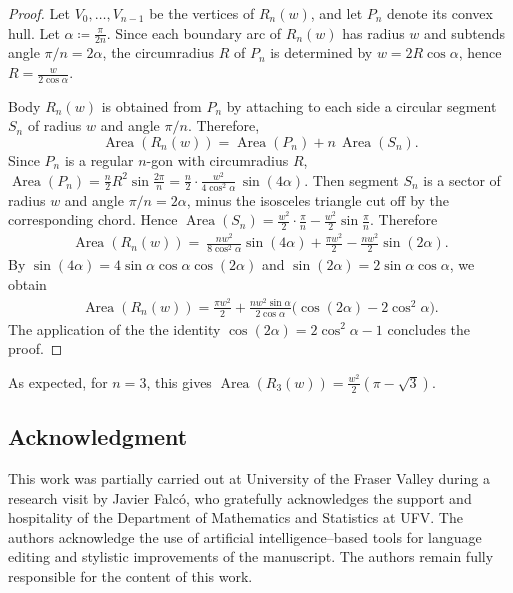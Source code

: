 \documentclass[11pt,letterpaper,reqno]{amsart}
\begin{document}
\begin{proof}
Let $V_0,\dots,V_{n-1}$ be the vertices of $R_n(w)$, and let $P_n$ denote its convex hull. Let
\(
\alpha\coloneqq \frac{\pi}{2n}.
\)
Since each boundary arc of $R_n(w)$ has radius $w$ and subtends angle $\pi/n=2\alpha$, the circumradius $R$ of $P_n$ is determined by
$w=2R\cos\alpha$,
hence
$R=\frac{w}{2\cos\alpha}$.


Body $R_n(w)$ is obtained from $P_n$ by attaching to each side a circular segment $S_n$ of radius $w$ and angle $\pi/n$. 
Therefore, 
\[
\operatorname{Area}(R_n(w))
=\operatorname{Area}(P_n)+n\,\operatorname{Area}(S_n).
\]
Since $P_n$ is a regular $n$-gon with circumradius $R$,
\(
\operatorname{Area}(P_n)=\frac{n}{2}R^2\sin\frac{2\pi}{n}
=\frac{n}{2}\cdot \frac{w^2}{4\cos^2\alpha}\,\sin(4\alpha).
\)
Then segment $S_n$ is a sector of radius $w$ and angle $\pi/n=2\alpha$, minus the isosceles triangle cut off by the corresponding chord. Hence
\(
\operatorname{Area}(S_n)
=\frac{w^2}{2}\cdot \frac{\pi}{n}-\frac{w^2}{2}\sin\frac{\pi}{n}.
\)
Therefore
\begin{align*}
\operatorname{Area}(R_n(w))
=\ \frac{n w^2}{8\cos^2\alpha}\sin(4\alpha)+\frac{\pi w^2}{2}-\frac{n w^2}{2}\sin(2\alpha).
\end{align*}
By $\sin(4\alpha)=4\sin\alpha\cos\alpha\cos(2\alpha)$ and $\sin(2\alpha)=2\sin\alpha\cos\alpha$, we obtain
\begin{align*}
\operatorname{Area}(R_n(w))
= \frac{\pi w^2}{2}+\frac{n w^2\sin\alpha}{2\cos\alpha}\bigl(\cos(2\alpha)-2\cos^2\alpha\bigr).
\end{align*}
The application of the the identity $\cos(2\alpha)=2\cos^2\alpha-1$ concludes the proof.
\end{proof}


As expected, for $n=3$, this gives
\(
\operatorname{Area}(R_3(w))
=\frac{w^2}{2}(\pi-\sqrt3).
\)

\subsection*{Acknowledgment}
This work was partially carried out at University of the Fraser Valley during a research visit by Javier Falcó, who gratefully acknowledges the support and hospitality of the Department of Mathematics and Statistics at UFV. The authors acknowledge the use of artificial intelligence–based tools for language editing and stylistic improvements
of the manuscript. The authors remain fully responsible for the content of this work.
\end{document}
